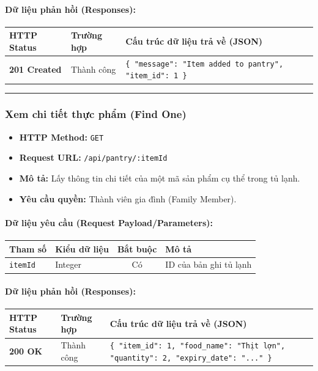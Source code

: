 \documentclass[12pt,a4paper]{article}
\begin{document}
\paragraph{Dữ liệu phản hồi (Responses):}
\begin{longtable}{|>{\raggedright\arraybackslash}p{2.8cm}|>{\raggedright\arraybackslash}p{3.2cm}|>{\raggedright\arraybackslash}p{8.0cm}|}
\hline
\textbf{HTTP Status} & \textbf{Trường hợp} & \textbf{Cấu trúc dữ liệu trả về (JSON)} \\ \hline
\endhead
\textbf{201 Created} & Thành công & \texttt{\{ "message": "Item added to pantry", "item\_id": 1 \}} \\ \hline
\end{longtable}

\vskip 0.4cm
\noindent\rule{\textwidth}{0.3pt}
\vskip 0.4cm

\subsubsection{Xem chi tiết thực phẩm (Find One)}
\begin{itemize}[leftmargin=*]
    \item \textbf{HTTP Method:} \texttt{GET}
    \item \textbf{Request URL:} \texttt{/api/pantry/:itemId}
    \item \textbf{Mô tả:} Lấy thông tin chi tiết của một mã sản phẩm cụ thể trong tủ lạnh.
    \item \textbf{Yêu cầu quyền:} Thành viên gia đình (Family Member).
\end{itemize}

\paragraph{Dữ liệu yêu cầu (Request Payload/Parameters):}
\begin{longtable}{|>{\raggedright\arraybackslash}p{2.8cm}|>{\raggedright\arraybackslash}p{2.2cm}|c|>{\raggedright\arraybackslash}p{7.0cm}|}
\hline
\textbf{Tham số} & \textbf{Kiểu dữ liệu} & \textbf{Bắt buộc} & \textbf{Mô tả} \\ \hline
\endhead
\texttt{itemId} & Integer & Có & ID của bản ghi tủ lạnh \\ \hline
\end{longtable}

\paragraph{Dữ liệu phản hồi (Responses):}
\begin{longtable}{|>{\raggedright\arraybackslash}p{2.8cm}|>{\raggedright\arraybackslash}p{3.2cm}|>{\raggedright\arraybackslash}p{8.0cm}|}
\hline
\textbf{HTTP Status} & \textbf{Trường hợp} & \textbf{Cấu trúc dữ liệu trả về (JSON)} \\ \hline
\endhead
\textbf{200 OK} & Thành công & \texttt{\{ "item\_id": 1, "food\_name": "Thịt lợn", "quantity": 2, "expiry\_date": "..." \}} \\ \hline
\end{longtable}
\end{document}
